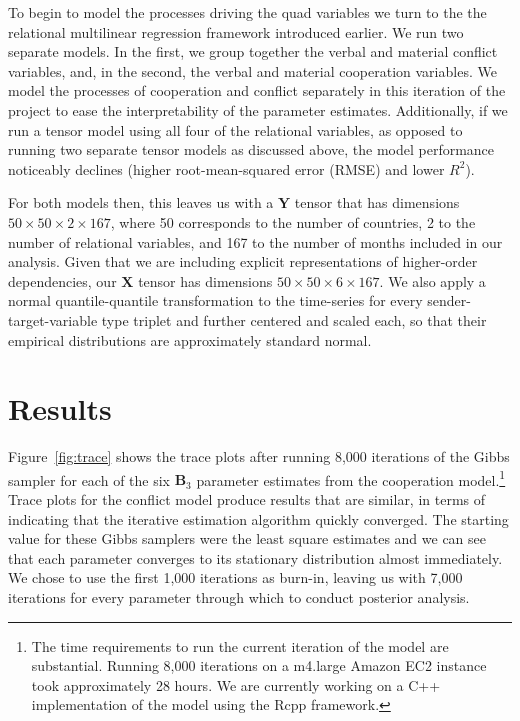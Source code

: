 \documentclass[3p,times,twocolumn,authoryear,12pt]{elsarticle}
\newcommand{\bl}[1]{{\mathbf #1}}
\begin{document}
To begin to model the processes driving the quad variables we turn to the the relational multilinear regression framework introduced earlier. We run two separate models. In the first, we group together the verbal and material conflict variables, and, in the second, the verbal and material cooperation variables. We model the processes of cooperation and conflict separately in this iteration of the project to ease the interpretability of the parameter estimates. Additionally, if we run a tensor model using all four of the relational variables, as opposed to running two separate tensor models as discussed above, the model performance noticeably declines (higher root-mean-squared error (RMSE) and lower $R^2$). 

For both models then, this leaves us with a $\bl Y$ tensor that has dimensions $50 \times 50 \times 2 \times 167$, where 50 corresponds to the number of countries, 2 to the number of relational variables, and 167 to the number of months included in our analysis. Given that we are including explicit representations of higher-order dependencies, our $\bl X$ tensor has dimensions $50 \times 50 \times 6 \times 167$. We also apply a normal quantile-quantile transformation to the time-series for every sender-target-variable type triplet and further centered and scaled each, so that their empirical distributions are approximately standard normal. 

\section{Results}

Figure~\ref{fig:trace} shows the trace plots after running 8,000 iterations of the Gibbs sampler for each of the six $\bl B_3$ parameter estimates from the cooperation model.\footnote{The time requirements to run the current iteration of the model are substantial. Running 8,000 iterations on a m4.large Amazon EC2 instance took approximately 28 hours. We are currently working on a C++ implementation of the model using the Rcpp framework.} Trace plots for the conflict model produce results that are similar, in terms of indicating that the iterative estimation algorithm quickly converged. The starting value for these Gibbs samplers were the least square estimates and we can see that each parameter converges to its stationary distribution almost immediately. We chose to use the first 1,000 iterations as burn-in, leaving us with 7,000 iterations for every parameter through which to conduct posterior analysis.
\end{document}
